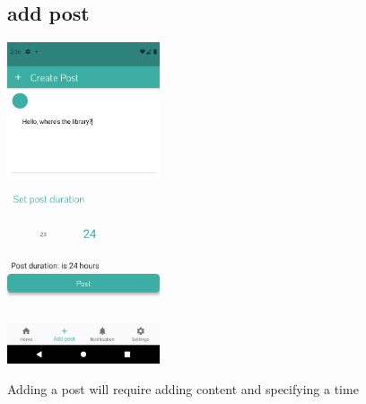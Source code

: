 \documentclass[12pt]{article}
\begin{document}
\begin{figure}[t!]
  \subsection*{add post}
{\includegraphics[width=0.4\textwidth]{./Screenshots/11.PNG}}
  \caption{Adding a post will require adding content and specifying a time}
\end{figure}
\end{document}
